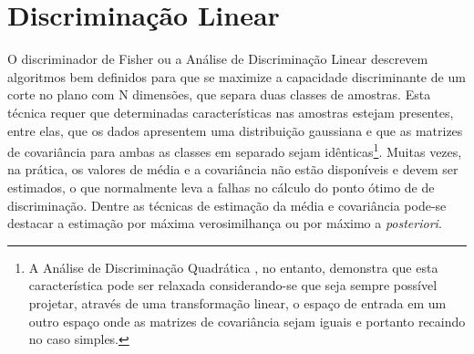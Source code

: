 




\section{Discriminação Linear}

O discriminador de Fisher \cite{fisher} ou a Análise de Discriminação Linear
\cite{duda} descrevem algoritmos bem definidos para que se maximize a
capacidade discriminante de um corte no plano com N dimensões, que separa duas
classes de amostras. Esta técnica requer que determinadas características nas
amostras estejam presentes, entre elas, que os dados apresentem uma
distribuição gaussiana e que as matrizes de covariância para ambas as classes
em separado sejam idênticas\footnote{A Análise de Discriminação Quadrática
\cite{duda}, no entanto, demonstra que esta característica pode ser relaxada
considerando-se que seja sempre possível projetar, através de uma
transformação linear, o espaço de entrada em um outro espaço onde as matrizes
de covariância sejam iguais e portanto recaindo no caso simples.}. Muitas
vezes, na prática, os valores de média e a covariância não estão disponíveis e
devem ser estimados, o que normalmente leva a falhas no cálculo do ponto ótimo
de de discriminação. Dentre as técnicas de estimação da média e covariância
pode-se destacar a estimação por máxima verosimilhança ou por máximo a
\textit{posteriori}.

